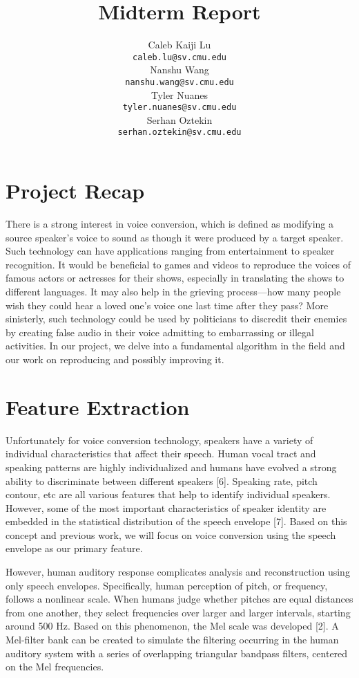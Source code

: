 \documentclass{article}
\title{Midterm Report}
\author{
  Caleb Kaiji Lu\\
  \texttt{caleb.lu@sv.cmu.edu} \\
  \And
  Nanshu Wang\\
  \texttt{nanshu.wang@sv.cmu.edu} \\
   \And
  Tyler Nuanes\\
  \texttt{tyler.nuanes@sv.cmu.edu} \\
  \And
   Serhan Oztekin\\
  \texttt{serhan.oztekin@sv.cmu.edu} \\
}
\begin{document}

\maketitle



\section{Project Recap}

There is a strong interest in voice conversion, which is defined as modifying a source speaker's voice to sound as though it were produced by a target speaker. Such technology can have applications ranging from entertainment to speaker recognition. It would be beneficial to games and videos to reproduce the voices of famous actors or actresses for their shows, especially in translating the shows to different languages. It may also help in the grieving process---how many people wish they could hear a loved one's voice one last time after they pass? More sinisterly, such technology could be used by politicians to discredit their enemies by creating false audio in their voice admitting to embarrassing or illegal activities. In our project, we delve into a fundamental algorithm in the field and our work on reproducing and possibly improving it.

\section{Feature Extraction}
Unfortunately for voice conversion technology, speakers have a variety of individual characteristics that affect their speech. Human vocal tract and speaking patterns are highly individualized and humans have evolved a strong ability to discriminate between different speakers [6].  Speaking rate, pitch contour, etc are all various features that help to identify individual speakers. However, some of the most important characteristics of speaker identity are embedded in the statistical distribution of the speech envelope [7]. Based on this concept and previous work, we will focus on voice conversion using the speech envelope as our primary feature.
 
However, human auditory response complicates analysis and reconstruction using only speech envelopes. Specifically, human perception of pitch, or frequency, follows a nonlinear scale. When humans judge whether pitches are equal distances from one another, they select frequencies over larger and larger intervals, starting around 500 Hz. Based on this phenomenon, the Mel scale was developed [2]. A Mel-filter bank can be created to simulate the filtering occurring in the human auditory system with a series of overlapping triangular bandpass filters, centered on the Mel frequencies. 
 
\end{document}
